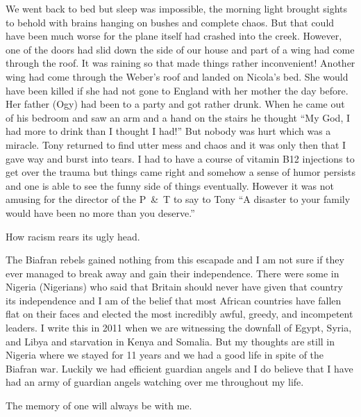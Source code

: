 We went back to bed but sleep was impossible, the morning light
brought sights to behold with brains hanging on bushes and complete
chaos. But that could have been much worse for the plane itself had
crashed into the creek. However, one of the doors had slid down the
side of our house and part of a wing had come through the roof. It was
raining so that made things rather inconvenient! Another wing had come
through the Weber's roof and landed on Nicola's bed. She would have
been killed if she had not gone to England with her mother the day
before. Her father (Ogy) had been to a party and got rather
drunk. When he came out of his bedroom and saw an arm and a hand on
the stairs he thought ``My God, I had more to drink than I thought I
had!'' But nobody was hurt which was a miracle. Tony returned to find
utter mess and chaos and it was only then that I gave way and burst
into tears. I had to have a course of vitamin B12 injections to get
over the trauma but things came right and somehow a sense of humor
persists and one is able to see the funny side of things
eventually. However it was not amusing for the director of the P~\&~T
to say to Tony ``A disaster to your family would have been no more
than you deserve.''

How racism rears its ugly head.

The Biafran rebels gained nothing from this escapade and I am not sure
if they ever managed to break away and gain their independence. There
were some in Nigeria (Nigerians) who said that Britain should never
have given that country its independence and I am of the belief that
most African countries have fallen flat on their faces and elected the
most incredibly awful, greedy, and incompetent leaders. I write this
in 2011 when we are witnessing the downfall of Egypt, Syria, and Libya
and starvation in Kenya and Somalia. But my thoughts are still in
Nigeria where we stayed for 11 years and we had a good life in spite
of the Biafran war. Luckily we had efficient guardian angels and I do
believe that I have had an army of guardian angels watching over me
throughout my life.

The memory of one will always be with me.

